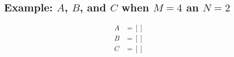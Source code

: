 \documentclass[12pt]{article}
\begin{document}
\pagebreak
\begin{landscape}
	\subsection{Example: $A$, $B$, and $C$ when $M=4$ an $N=2$}
	\tiny
	\begin{align}
		A&=\left[\right]\\
		B&=\left[\right]\\
		C&=\left[\right]
	\end{align}
\end{landscape}
\end{document}

